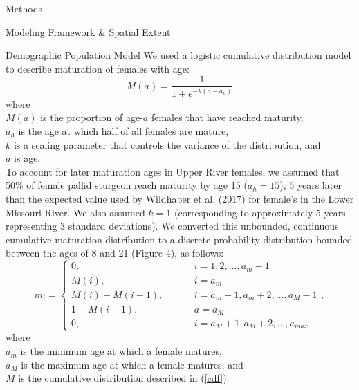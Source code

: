 \documentclass[12pt]{article}
\begin{document}
\begin{section}{Methods}
\begin{subsection}{Modeling Framework \& Spatial Extent}
\begin{subsubsection}{Demographic Population Model}
We used a logistic cumulative distribution model to describe maturation of females with age:
\begin{equation}
M(a)=\frac{1}{1+e^{-k(a-a_h)}}
\label{cdf}
\end{equation}  
where\\
\hspace*{0.5cm}$M(a)$ is the proportion of age-$a$ females that have reached maturity,\\
\hspace*{0.5cm}$a_h$ is the age at which half of all females are mature,\\ 
\hspace*{0.5cm}$k$ is a scaling parameter that controls the variance of the distribution, and\\
\hspace*{0.5cm}$a$ is age.\\

To account for later maturation ages in Upper River females, we assumed that 50\% of female pallid sturgeon reach maturity by age 15 ($a_h=15$), 5 years later than the expected value used by Wildhaber et al. (2017) for female's in the Lower Missouri River.  We also assumed $k=1$ (corresponding to approximately 5 years representing 3 standard deviations).  We converted this unbounded, continuous cumulative maturation distribution to a discrete probability distribution bounded between the ages of 8 and 21 (Figure 4), as follows: 
\begin{equation}
m_i = \begin{cases}
0, & \hspace{1cm} i=1, 2, \dots, a_m-1\\
M(i), & \hspace{1cm} i=a_m\\
M(i)-M(i-1), & \hspace{1cm} i=a_m+1, a_m+2, \ldots, a_M-1\\
1-M(i-1), & \hspace{1cm} a=a_M\\
0, & \hspace{1cm} i=a_M+1, a_M+2, \ldots, a_{max}
\end{cases},
\label{mi}
\end{equation} 
where\\
\hspace*{0.5cm}$a_m$ is the minimum age at which a female matures,\\
\hspace*{0.5cm}$a_M$ is the maximum age at which a female matures, and\\ 
\hspace*{0.5cm}$M$ is the cumulative distribution described in (\ref{cdf}).\\ 



\end{subsubsection}
\end{subsection}
\end{section}
\end{document}
